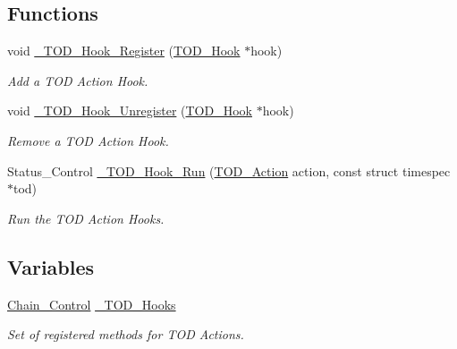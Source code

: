 \subsection*{Functions}
\begin{DoxyCompactItemize}
\item 
void \mbox{\hyperlink{group__RTEMSScoreTODHooks_ga9db96e52b259d049f468578e081605ff}{\+\_\+\+T\+O\+D\+\_\+\+Hook\+\_\+\+Register}} (\mbox{\hyperlink{structTOD__Hook}{T\+O\+D\+\_\+\+Hook}} $\ast$hook)
\begin{DoxyCompactList}\small\item\em Add a T\+OD Action Hook. \end{DoxyCompactList}\item 
void \mbox{\hyperlink{group__RTEMSScoreTODHooks_ga1d70eadc6cc3f1c7766d9fb6b8709e65}{\+\_\+\+T\+O\+D\+\_\+\+Hook\+\_\+\+Unregister}} (\mbox{\hyperlink{structTOD__Hook}{T\+O\+D\+\_\+\+Hook}} $\ast$hook)
\begin{DoxyCompactList}\small\item\em Remove a T\+OD Action Hook. \end{DoxyCompactList}\item 
Status\+\_\+\+Control \mbox{\hyperlink{group__RTEMSScoreTODHooks_ga115a4768c4a7c4fd838809465fc3d6e8}{\+\_\+\+T\+O\+D\+\_\+\+Hook\+\_\+\+Run}} (\mbox{\hyperlink{group__RTEMSScoreTODHooks_gab9b3d7e3a626139950c25efa888d4332}{T\+O\+D\+\_\+\+Action}} action, const struct timespec $\ast$tod)
\begin{DoxyCompactList}\small\item\em Run the T\+OD Action Hooks. \end{DoxyCompactList}\end{DoxyCompactItemize}
\subsection*{Variables}
\begin{DoxyCompactItemize}
\item 
\mbox{\label{group__RTEMSScoreTODHooks_ga1185059aa76531a8be5cc3dfe29d4d2b}} 
\mbox{\hyperlink{unionChain__Control}{Chain\+\_\+\+Control}} \mbox{\hyperlink{group__RTEMSScoreTODHooks_ga1185059aa76531a8be5cc3dfe29d4d2b}{\+\_\+\+T\+O\+D\+\_\+\+Hooks}}
\begin{DoxyCompactList}\small\item\em Set of registered methods for T\+OD Actions. \end{DoxyCompactList}\end{DoxyCompactItemize}


